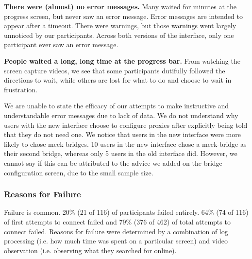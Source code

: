 \documentclass[USenglish,oneside,twocolumn]{article}
\begin{document}
\begin{description}
\item {\bfseries There were (almost) no error messages.} Many waited for minutes at the progress screen, but never saw an error message. Error messages are intended to appear after a timeout. There were warnings, but those warnings went largely unnoticed by our participants. Across both versions of the interface, only one participant ever saw an error message. 

\item {\bfseries People waited a long, long time at the progress bar.}
From watching the screen capture videos, we see that some participants dutifully followed the directions to wait, while others are lost for what to do and choose to wait in frustration.
\end{description} 

We are unable to state the efficacy of our attempts to make instructive and understandable error messages due to lack of data. We do not understand why users with the new interface choose to configure proxies after explicitly being told that they do not need one. We notice that users in the new interface were more likely to chose meek bridges. 10 users in the new interface chose a meek-bridge as their second bridge, whereas only 5 users in the old interface did. However, we cannot say if this can be attributed to the advice we added on the bridge configuration screen, due to the small sample size. 

\subsubsection{Reasons for Failure} 
Failure is common. 20\% (21 of 116) of participants failed entirely. 64\% (74 of 116) of first attempts to connect failed and 79\% (376 of 462) of total attempts to connect failed. Reasons for failure were determined by a combination of log processing (i.e. how much time was spent on a particular screen) and video observation (i.e. observing what they searched for online). \\ 
\end{document}
